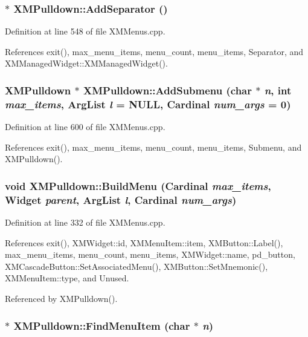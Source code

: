 \subsubsection{ $\ast$ XMPulldown::Add\-Separator ()}\label{classXMPulldown_a10}




Definition at line 548 of file XMMenus.cpp.

References exit(), max\_\-menu\_\-items, menu\_\-count, menu\_\-items, Separator, and XMManaged\-Widget::XMManaged\-Widget().
\subsubsection{\setlength{\rightskip}{0pt plus 5cm}XMPulldown $\ast$ XMPulldown::Add\-Submenu (char $\ast$ {\em n}, int {\em max\_\-items}, Arg\-List {\em l} = NULL, Cardinal {\em num\_\-args} = 0)}\label{classXMPulldown_a11}




Definition at line 600 of file XMMenus.cpp.

References exit(), max\_\-menu\_\-items, menu\_\-count, menu\_\-items, Submenu, and XMPulldown().
\subsubsection{\setlength{\rightskip}{0pt plus 5cm}void XMPulldown::Build\-Menu (Cardinal {\em max\_\-items}, Widget {\em parent}, Arg\-List {\em l}, Cardinal {\em num\_\-args})\hspace{0.3cm}{\tt  [protected]}}\label{classXMPulldown_b0}




Definition at line 332 of file XMMenus.cpp.

References exit(), XMWidget::id, XMMenu\-Item::item, XMButton::Label(), max\_\-menu\_\-items, menu\_\-count, menu\_\-items, XMWidget::name, pd\_\-button, XMCascade\-Button::Set\-Associated\-Menu(), XMButton::Set\-Mnemonic(), XMMenu\-Item::type, and Unused.

Referenced by XMPulldown().
\subsubsection{ $\ast$ XMPulldown::Find\-Menu\-Item (char $\ast$ {\em n})}\label{classXMPulldown_a15}




